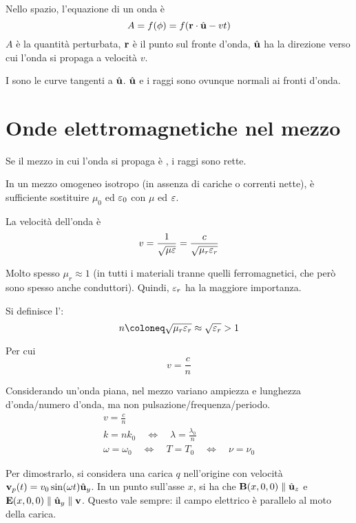 Nello spazio, l'equazione di un onda è
\begin{equation}
    A = f(\phi) = f(\mathbf{r} \cdot \hat{\mathbf{u}} - vt)
\end{equation}
$A$ è la quantità perturbata, $\mathbf{r}$ è il punto sul fronte d'onda, $\hat{\mathbf{u}}$ ha la direzione verso cui l'onda si propaga a velocità $v$.

I  sono le curve tangenti a $\hat{\mathbf{u}}$.
$\hat{\mathbf{u}}$ e i raggi sono ovunque normali ai fronti d'onda.

\section{Onde elettromagnetiche nel mezzo}

Se il mezzo in cui l'onda si propaga è , i raggi sono rette.

In un mezzo omogeneo isotropo (in assenza di cariche o correnti nette), è sufficiente sostituire $\mu_0$ ed $\varepsilon_0$ con $\mu$ ed $\varepsilon$.

La velocità dell'onda è
\begin{equation}
    v = \frac{1}{\sqrt{\mu \varepsilon}} = \frac{c}{\sqrt{\mu_r \varepsilon_r}}
\end{equation}

Molto spesso $\mu_r \approx 1$ (in tutti i materiali tranne quelli ferromagnetici, che però sono spesso anche conduttori).
Quindi, $\varepsilon_r$ ha la maggiore importanza.

Si definisce l':
\begin{equation}
    n \coloneq \sqrt{\mu_r \eps_r} \approx \sqrt{\eps_r} > 1
\end{equation}

Per cui
\begin{equation}
    v = \frac{c}{n}
\end{equation}

Considerando un'onda piana, nel mezzo variano ampiezza e lunghezza d'onda/numero d'onda, ma non pulsazione/frequenza/periodo.
\begin{gather}
    v = \frac{c}{n} \\
    k = n k_0
    \quad \iff \quad
    \lambda = \frac{\lambda_0}{n} \\
    \omega = \omega_0
    \quad \iff \quad
    T = T_0
    \quad \iff \quad
    \nu = \nu_0
\end{gather}

Per dimostrarlo, si considera una carica $q$ nell'origine con velocità $\mathbf{v}_p(t) = v_0 \sin(\omega t) \hat{\mathbf{u}}_{y}$.
In un punto sull'asse $x$, si ha che $\mathbf{B}(x, 0, 0) \parallel \hat{\mathbf{u}}_{z}$ e $\mathbf{E}(x, 0, 0) \parallel \hat{\mathbf{u}}_{y} \parallel \mathbf{v}$.
Questo vale sempre: il campo elettrico è parallelo al moto della carica.

